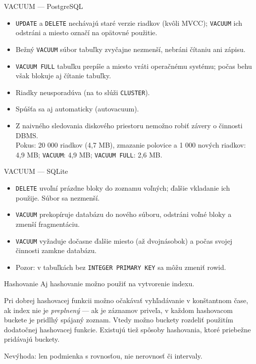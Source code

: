 \documentclass[12pt]{beamer}
\begin{document}
\begin{frame}{VACUUM --- PostgreSQL}
\begin{itemize}
\item \texttt{UPDATE} a \texttt{DELETE} nechávajú staré verzie riadkov (kvôli MVCC); \texttt{VACUUM} ich odstráni a miesto označí na opätovné použitie.
\item Bežný \texttt{VACUUM} súbor tabuľky zvyčajne nezmenší, nebráni čítaniu ani zápisu.
\item \texttt{VACUUM FULL} tabuľku prepíše a miesto vráti operačnému systému; počas behu však blokuje aj čítanie tabuľky.
\item Riadky neusporadúva (na to slúži \texttt{CLUSTER}).
\item Spúšťa sa aj automaticky (autovacuum).
\item Z naivného sledovania diskového priestoru nemožno robiť závery o činnosti DBMS.\\
{\footnotesize Pokus: 20 000 riadkov (4,7 MB), zmazanie polovice a 1 000 nových riadkov: 4,9 MB; \texttt{VACUUM}: 4,9 MB; \texttt{VACUUM FULL}: 2,6 MB.}
\end{itemize}
\end{frame}

\begin{frame}{VACUUM --- SQLite}
\begin{itemize}
\item \texttt{DELETE} uvoľní prázdne bloky do zoznamu voľných; ďalšie vkladanie ich použije. Súbor sa nezmenší.
\item \texttt{VACUUM} prekopíruje databázu do nového súboru, odstráni voľné bloky a zmenší fragmentáciu.
\item \texttt{VACUUM} vyžaduje dočasne ďalšie miesto (až dvojnásobok) a počas svojej činnosti zamkne databázu.
\item Pozor: v tabuľkách bez \texttt{INTEGER PRIMARY KEY} sa môžu zmeniť rowid.
\end{itemize}
\end{frame}

\begin{frame}[fragile]{Hashovanie}
Aj hashovanie možno použiť na vytvorenie indexu.
\bigskip

Pri dobrej hashovacej funkcii možno očakávať vyhľadávanie v konštantnom čase,
ak index nie je \emph{preplnený} --- ak je záznamov priveľa, v každom hashovacom buckete
je pridlhý spájaný zoznam. Vtedy možno buckety rozdeliť použitím dodatočnej hashovacej funkcie.
Existujú tiež spôsoby hashovania, ktoré priebežne pridávajú buckety.
\bigskip

Nevýhoda: len podmienka s rovnosťou, nie nerovnosť či intervaly.
\end{frame}
\end{document}
